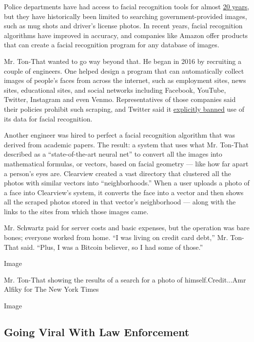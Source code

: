 Police departments have had access to facial recognition tools for
almost
\href{https://www.nytimes3xbfgragh.onion/2020/01/12/technology/facial-recognition-police.html}{20
years}, but they have historically been limited to searching
government-provided images, such as mug shots and driver's license
photos. In recent years, facial recognition algorithms have improved in
accuracy, and companies like Amazon offer products that can create a
facial recognition program for any database of images.

Mr. Ton-That wanted to go way beyond that. He began in 2016 by
recruiting a couple of engineers. One helped design a program that can
automatically collect images of people's faces from across the internet,
such as employment sites, news sites, educational sites, and social
networks including Facebook, YouTube, Twitter, Instagram and even Venmo.
Representatives of those companies said their policies prohibit such
scraping, and Twitter said it
\href{https://developer.twitter.com/en/developer-terms/more-on-restricted-use-cases}{explicitly
banned} use of its data for facial recognition.

Another engineer was hired to perfect a facial recognition algorithm
that was derived from academic papers. The result: a system that uses
what Mr. Ton-That described as a ``state-of-the-art neural net'' to
convert all the images into mathematical formulas, or vectors, based on
facial geometry --- like how far apart a person's eyes are. Clearview
created a vast directory that clustered all the photos with similar
vectors into ``neighborhoods.'' When a user uploads a photo of a face
into Clearview's system, it converts the face into a vector and then
shows all the scraped photos stored in that vector's neighborhood ---
along with the links to the sites from which those images came.

Mr. Schwartz paid for server costs and basic expenses, but the operation
was bare bones; everyone worked from home. ``I was living on credit card
debt,'' Mr. Ton-That said. ``Plus, I was a Bitcoin believer, so I had
some of those.''

Image

Mr. Ton-That showing the results of a search for a photo of
himself.Credit...Amr Alfiky for The New York Times

Image

\hypertarget{going-viral-with-law-enforcement}{%
\subsection{Going Viral With Law
Enforcement}\label{going-viral-with-law-enforcement}}

